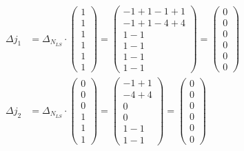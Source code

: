 \documentclass[12pt, paper=a4]{article}
\begin{document}
\begin{align*}
\Delta j_1 &= \Delta_{N_{LS}} \cdot \begin{pmatrix}1 \\ 1 \\ 1 \\ 1 \\ 1 \\ 1\end{pmatrix} = 
\begin{pmatrix}-1+1-1+1 \\ -1+1-4+4 \\ 1-1 \\ 1-1 \\ 1-1 \\ 1-1\end{pmatrix} = 
\begin{pmatrix}0 \\ 0 \\ 0 \\ 0 \\ 0 \\ 0\end{pmatrix}
\\
\Delta j_2 &= \Delta_{N_{LS}} \cdot \begin{pmatrix}0 \\ 0 \\ 0 \\ 1 \\ 1 \\ 1\end{pmatrix} = 
\begin{pmatrix}-1+1 \\ -4+4 \\ 0 \\ 0 \\ 1-1 \\ 1-1\end{pmatrix} = 
\begin{pmatrix}0 \\ 0 \\ 0 \\ 0 \\ 0 \\ 0\end{pmatrix}
\end{align*}
\end{document}
